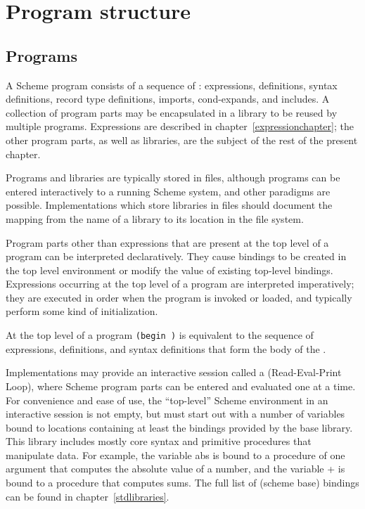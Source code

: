 \chapter{Program structure}
\label{programchapter}

\section{Programs}

A Scheme program consists of a sequence of 
: expressions, definitions, syntax definitions,
record type definitions, imports, cond-expands, and includes.  A collection of program
parts may be encapsulated in a library to be reused by multiple
programs.
Expressions are described in chapter~\ref{expressionchapter};
the other program parts, as well as libraries, are the subject of the
rest of the present chapter.

Programs and libraries are typically stored in files, although programs
can be entered interactively to a running Scheme system, and other
paradigms are possible.
Implementations which store libraries in files should document the
mapping from the name of a library to its location in the file system.

Program parts other than expressions that are present
at the top level of a program can be interpreted declaratively.
They cause bindings to be created in the top level
environment or modify the value of existing top-level bindings.
Expressions occurring at the top level of a program are
interpreted imperatively; they are executed in order when the program is
invoked or loaded, and typically perform some kind of initialization.


At the top level of a program {\tt(begin  \dotsfoo)} is
equivalent to the sequence of expressions, definitions, and syntax definitions
that form the body of the .

Implementations may provide an interactive session called a
 (Read-Eval-Print Loop), where Scheme program parts can be
entered and evaluated one at a time.  For convenience and ease of use,
the ``top-level'' Scheme environment in an interactive
session is not empty, but must start out with a number of variables
bound to locations containing at least the bindings provided by the
base library.  This library includes mostly core syntax
and primitive procedures that manipulate data.  For example, the
variable {\cf abs} is bound to a
procedure of one argument that computes the absolute value of a
number, and the variable {\cf +} is bound to a procedure that computes
sums.  The full list of {\cf(scheme base)} bindings can be found in
chapter~\ref{stdlibraries}.


